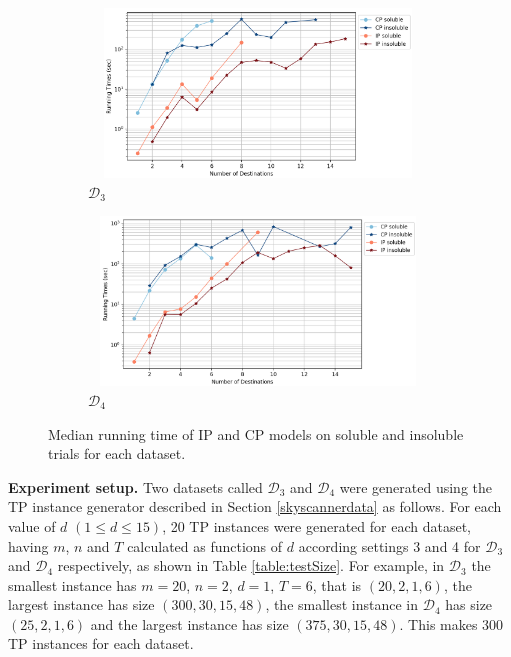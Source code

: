 \documentclass{mpaper}
\begin{document}
\begin{figure}[!ht]
    \centering
    \begin{subfigure}[b]{0.49\textwidth}
        \includegraphics[width=9cm, height = 4.5cm]{cpipexperiments/cpipsatunsatnotsolved_d_log_v2.png}
        \caption{$\mathcal{D}_3$}
        \label{fig:cpipsatunsat_d}
    \end{subfigure}
    \begin{subfigure}[b]{0.49\textwidth}
        \includegraphics[width=9cm, height = 4.5cm]{cpipexperiments/cpipsatunsatnotsolved_d2_log_v2.png}
        \caption{$\mathcal{D}_4$}
        \label{fig:cpipsatunsat_d2}
    \end{subfigure}
    \caption{Median running time of IP and CP models on soluble and insoluble trials for each dataset.}
    \label{cpipsatunsat}
\end{figure}

\textbf{Experiment setup.} Two datasets called $\mathcal{D}_3$ and $\mathcal{D}_4$ were generated using the TP instance generator described in Section \ref{skyscannerdata} as follows. For each value of $d$ $(1 \leq d \leq 15)$, 20 TP instances were generated for each dataset, having $m$, $n$ and $T$ calculated as functions of $d$ according settings 3 and 4 for $\mathcal{D}_3$ and $\mathcal{D}_4$ respectively, as shown in Table \ref{table:testSize}. For example, in $\mathcal{D}_3$ the smallest instance has $m=20$, $n=2$, $d=1$, $T=6$, that is $(20,2,1,6)$, the largest instance has size $(300,30,15,48)$, the smallest instance in $\mathcal{D}_4$ has size $(25,2,1,6)$ and the largest instance has size $(375,30,15,48)$. This makes 300 TP instances for each dataset.
\end{document}
